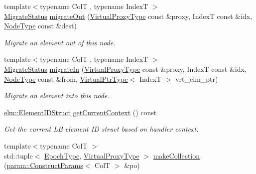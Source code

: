 \begin{DoxyCompactItemize}
{\footnotesize template$<$typename ColT , typename IndexT $>$ }\\\hyperlink{namespacevt_1_1vrt_1_1collection_ad221ad8aea9e586689b4335f5bcd9804}{Migrate\+Status} \hyperlink{structvt_1_1vrt_1_1collection_1_1_collection_manager_a480360a498a18520cbe2405ebbe7e9b6}{migrate\+Out} (\hyperlink{namespacevt_a1b417dd5d684f045bb58a0ede70045ac}{Virtual\+Proxy\+Type} const \&proxy, IndexT const \&idx, \hyperlink{namespacevt_a866da9d0efc19c0a1ce79e9e492f47e2}{Node\+Type} const \&dest)
\begin{DoxyCompactList}\small\item\em Migrate an element out of this node. \end{DoxyCompactList}\item 
{\footnotesize template$<$typename ColT , typename IndexT $>$ }\\\hyperlink{namespacevt_1_1vrt_1_1collection_ad221ad8aea9e586689b4335f5bcd9804}{Migrate\+Status} \hyperlink{structvt_1_1vrt_1_1collection_1_1_collection_manager_a57458749baaff4b2d76a17e68ffcf912}{migrate\+In} (\hyperlink{namespacevt_a1b417dd5d684f045bb58a0ede70045ac}{Virtual\+Proxy\+Type} const \&proxy, IndexT const \&idx, \hyperlink{namespacevt_a866da9d0efc19c0a1ce79e9e492f47e2}{Node\+Type} const \&from, \hyperlink{structvt_1_1vrt_1_1collection_1_1_collection_manager_a086cab4af6af4f869fbf8814c3a9a6a4}{Virtual\+Ptr\+Type}$<$ IndexT $>$ vrt\+\_\+elm\+\_\+ptr)
\begin{DoxyCompactList}\small\item\em Migrate an element into this node. \end{DoxyCompactList}\item 
\hyperlink{structvt_1_1elm_1_1_element_i_d_struct}{elm\+::\+Element\+I\+D\+Struct} \hyperlink{structvt_1_1vrt_1_1collection_1_1_collection_manager_aeb9f3e6a1411d77d0a9d87df97fc9e37}{get\+Current\+Context} () const
\begin{DoxyCompactList}\small\item\em Get the current LB element ID struct based on handler context. \end{DoxyCompactList}\item 
{\footnotesize template$<$typename ColT $>$ }\\std\+::tuple$<$ \hyperlink{namespacevt_a81d11b28122d43bf9834577e4a06440f}{Epoch\+Type}, \hyperlink{namespacevt_a1b417dd5d684f045bb58a0ede70045ac}{Virtual\+Proxy\+Type} $>$ \hyperlink{structvt_1_1vrt_1_1collection_1_1_collection_manager_a221921efd4421cb304ca99ebdfdf3117}{make\+Collection} (\hyperlink{structvt_1_1vrt_1_1collection_1_1param_1_1_construct_params}{param\+::\+Construct\+Params}$<$ ColT $>$ \&po)

\end{DoxyCompactItemize}
